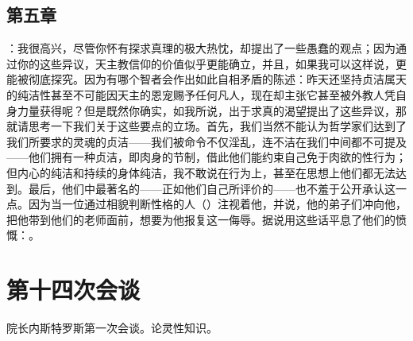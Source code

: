 
\subsection{第五章}

\par

：我很高兴，尽管你怀有探求真理的极大热忱，却提出了一些愚蠢的观点；因为通过你的这些异议，天主教信仰的价值似乎更能确立，并且，如果我可以这样说，更能被彻底探究。因为有哪个智者会作出如此自相矛盾的陈述：昨天还坚持贞洁属天的纯洁性甚至不可能因天主的恩宠赐予任何凡人，现在却主张它甚至被外教人凭自身力量获得呢？但是既然你确实，如我所说，出于求真的渴望提出了这些异议，那就请思考一下我们关于这些要点的立场。首先，我们当然不能认为哲学家们达到了我们所要求的灵魂的贞洁——我们被命令不仅淫乱，连不洁在我们中间都不可提及——他们拥有一种贞洁，即肉身的节制，借此他们能约束自己免于肉欲的性行为；但内心的纯洁和持续的身体纯洁，我不敢说在行为上，甚至在思想上他们都无法达到。最后，他们中最著名的——正如他们自己所评价的——也不羞于公开承认这一点。因为当一位通过相貌判断性格的人（）注视着他，并说，他的弟子们冲向他，把他带到他们的老师面前，想要为他报复这一侮辱。据说用这些话平息了他们的愤慨：。\par



\section{第十四次会谈}

\par

院长内斯特罗斯第一次会谈。论灵性知识。\par

